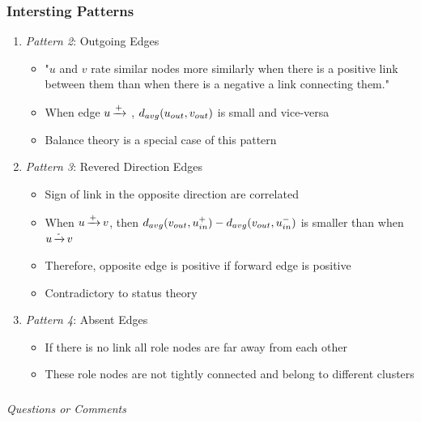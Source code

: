 \documentclass{beamer}
\begin{document}
\begin{frame}
    \frametitle{Intersting Patterns}
    \begin{enumerate}
        \item \textit{Pattern 2}: Outgoing Edges
        \begin{itemize}
            \item "$u$ and $v$ rate similar nodes more similarly when there is a positive link
            between them than when there is a negative a link connecting them."
            \item When edge $u \operatorname*{\xrightarrow{+}}$ , $d_{avg}(u_{out},v_{out})$ is small and vice-versa
            \item Balance theory is a special case of this pattern
        \end{itemize}
        \item \textit{Pattern 3}: Revered Direction Edges 
        \begin{itemize}
            \item Sign of link in the opposite direction are correlated
            \item When $u \operatorname*{\xrightarrow{+}} v$, then $d_{avg}(v_{out},u_{in}^{+})-d_{avg}(v_{out},u_{in}^{-})$ is smaller than when $u \operatorname*{\xrightarrow{-}} v$
            \item Therefore, opposite edge is positive if forward edge is positive
            \item Contradictory to status theory
        \end{itemize}
        \item \textit{Pattern 4}: Absent Edges
        \begin{itemize}
            \item If there is no link all role nodes are far away from each other
            \item These role nodes are not tightly connected and belong to different clusters
        \end{itemize}
    \end{enumerate}
    \hyperlink{slide:results}{}

\end{frame}

\begin{frame}
    \frametitle{}

    \centering \Large
    \emph{Questions or Comments}

\end{frame}



\end{document}
